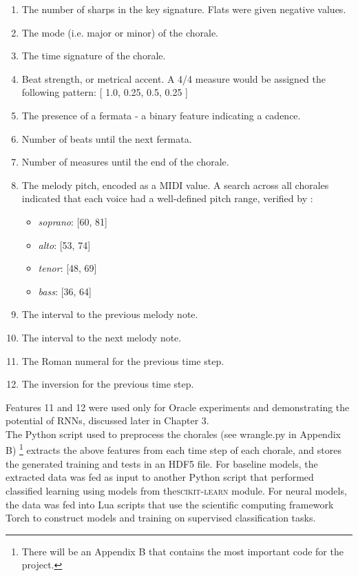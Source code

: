 \documentclass[11pt]{article}
\begin{document}
\begin{enumerate}
\item The number of sharps in the key signature. Flats were given negative values.
\item The mode (i.e. major or minor) of the chorale.
\item The time signature of the chorale.
\item Beat strength, or metrical accent. A 4/4 measure would be assigned the following pattern: [ 1.0, 0.25, 0.5, 0.25 ]
\item The presence of a fermata - a binary feature indicating a cadence.
\item Number of beats until the next fermata.
\item Number of measures until the end of the chorale.
\item The melody pitch, encoded as a MIDI value. A search across all chorales indicated that each voice had a well-defined pitch range, verified by \citet{madsen2002}: 
\begin{itemize}
\item \textit{soprano}: [60, 81]
\item \textit{alto}: [53, 74]
\item \textit{tenor}: [48, 69]
\item \textit{bass}: [36, 64]
\end{itemize}
\item The interval to the previous melody note.
\item The interval to the next melody note.
\item The Roman numeral for the previous time step.
\item The inversion for the previous time step.
\end{enumerate}

Features 11 and 12 were used only for Oracle experiments and demonstrating the potential of RNNs, discussed later in Chapter 3. \\

The Python script used to preprocess the chorales (see wrangle.py in Appendix B) \footnote{There will be an Appendix B that contains the most important code for the project.} extracts the above features from each time step of each chorale, and stores the generated training and tests in an HDF5 file. For baseline models, the extracted data was fed as input to another Python script that performed classified learning using models from the\textsc{scikit-learn} module. For neural models, the data was fed into Lua scripts that use the scientific computing framework Torch to construct models and training on supervised classification tasks.
\end{document}
